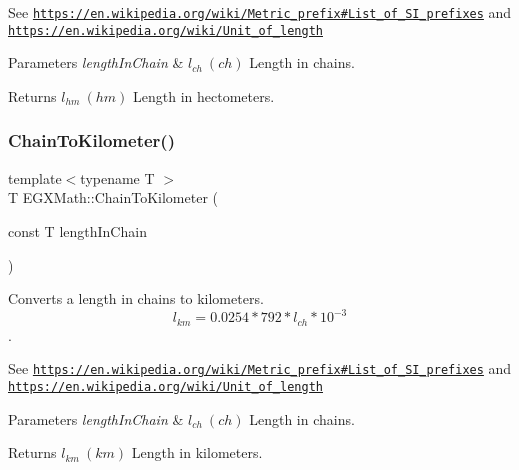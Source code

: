 See \href{https://en.wikipedia.org/wiki/Metric_prefix#List_of_SI_prefixes}{\tt https\+://en.\+wikipedia.\+org/wiki/\+Metric\+\_\+prefix\#\+List\+\_\+of\+\_\+\+S\+I\+\_\+prefixes} and \href{https://en.wikipedia.org/wiki/Unit_of_length}{\tt https\+://en.\+wikipedia.\+org/wiki/\+Unit\+\_\+of\+\_\+length} 
\begin{DoxyParams}{Parameters}
{\em length\+In\+Chain} & $ l_{ch}\ (ch)$ Length in chains. \\
\hline
\end{DoxyParams}
\begin{DoxyReturn}{Returns}
$ l_{hm}\ (hm)$ Length in hectometers. 
\end{DoxyReturn}
\mbox{\label{group___e_g_x_math-_conversions-_length_conversions-_imperial-_chain-_s_i_ga4fd4349867e45ce387c01403b8dcf426}} 
\subsubsection{\texorpdfstring{Chain\+To\+Kilometer()}{ChainToKilometer()}}
{\footnotesize\ttfamily template$<$typename T $>$ \\
T E\+G\+X\+Math\+::\+Chain\+To\+Kilometer (\begin{DoxyParamCaption}\item[{const T}]{length\+In\+Chain }\end{DoxyParamCaption})}



Converts a length in chains to kilometers. \[ l_{km}=0.0254 * 792 * l_{ch} * 10^{-3} \]. 

See \href{https://en.wikipedia.org/wiki/Metric_prefix#List_of_SI_prefixes}{\tt https\+://en.\+wikipedia.\+org/wiki/\+Metric\+\_\+prefix\#\+List\+\_\+of\+\_\+\+S\+I\+\_\+prefixes} and \href{https://en.wikipedia.org/wiki/Unit_of_length}{\tt https\+://en.\+wikipedia.\+org/wiki/\+Unit\+\_\+of\+\_\+length} 
\begin{DoxyParams}{Parameters}
{\em length\+In\+Chain} & $ l_{ch}\ (ch)$ Length in chains. \\
\hline
\end{DoxyParams}
\begin{DoxyReturn}{Returns}
$ l_{km}\ (km)$ Length in kilometers. 
\end{DoxyReturn}
\mbox{\label{group___e_g_x_math-_conversions-_length_conversions-_imperial-_chain-_s_i_gad564a80fe3ce7cb8c129758004256a12}} 
